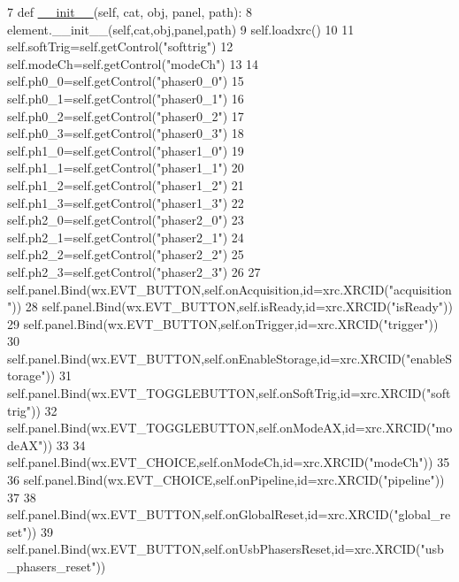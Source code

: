\begin{DoxyCode}
7     \textcolor{keyword}{def }\hyperlink{classwrapper_1_1ModuleDictWrapper_a9a7a794150502f51df687831583e13b9}{\_\_init\_\_}(self, cat, obj, panel, path):
8         element.\_\_init\_\_(self,cat,obj,panel,path)
9         self.loadxrc()
10                 
11         self.softTrig=self.getControl(\textcolor{stringliteral}{"softtrig"})
12         self.modeCh=self.getControl(\textcolor{stringliteral}{"modeCh"})
13 
14         self.ph0\_0=self.getControl(\textcolor{stringliteral}{"phaser0\_0"})
15         self.ph0\_1=self.getControl(\textcolor{stringliteral}{"phaser0\_1"})
16         self.ph0\_2=self.getControl(\textcolor{stringliteral}{"phaser0\_2"})
17         self.ph0\_3=self.getControl(\textcolor{stringliteral}{"phaser0\_3"})
18         self.ph1\_0=self.getControl(\textcolor{stringliteral}{"phaser1\_0"})
19         self.ph1\_1=self.getControl(\textcolor{stringliteral}{"phaser1\_1"})
20         self.ph1\_2=self.getControl(\textcolor{stringliteral}{"phaser1\_2"})
21         self.ph1\_3=self.getControl(\textcolor{stringliteral}{"phaser1\_3"})
22         self.ph2\_0=self.getControl(\textcolor{stringliteral}{"phaser2\_0"})
23         self.ph2\_1=self.getControl(\textcolor{stringliteral}{"phaser2\_1"})
24         self.ph2\_2=self.getControl(\textcolor{stringliteral}{"phaser2\_2"})
25         self.ph2\_3=self.getControl(\textcolor{stringliteral}{"phaser2\_3"})
26         
27         self.panel.Bind(wx.EVT\_BUTTON,self.onAcquisition,id=xrc.XRCID(\textcolor{stringliteral}{"acquisition"}))
28         self.panel.Bind(wx.EVT\_BUTTON,self.isReady,id=xrc.XRCID(\textcolor{stringliteral}{"isReady"}))
29         self.panel.Bind(wx.EVT\_BUTTON,self.onTrigger,id=xrc.XRCID(\textcolor{stringliteral}{"trigger"}))
30         self.panel.Bind(wx.EVT\_BUTTON,self.onEnableStorage,id=xrc.XRCID(\textcolor{stringliteral}{"enableStorage"}))
31         self.panel.Bind(wx.EVT\_TOGGLEBUTTON,self.onSoftTrig,id=xrc.XRCID(\textcolor{stringliteral}{"softtrig"}))
32         self.panel.Bind(wx.EVT\_TOGGLEBUTTON,self.onModeAX,id=xrc.XRCID(\textcolor{stringliteral}{"modeAX"}))
33 
34         self.panel.Bind(wx.EVT\_CHOICE,self.onModeCh,id=xrc.XRCID(\textcolor{stringliteral}{"modeCh"}))
35 
36         self.panel.Bind(wx.EVT\_CHOICE,self.onPipeline,id=xrc.XRCID(\textcolor{stringliteral}{"pipeline"}))
37 
38         self.panel.Bind(wx.EVT\_BUTTON,self.onGlobalReset,id=xrc.XRCID(\textcolor{stringliteral}{"global\_reset"}))
39         self.panel.Bind(wx.EVT\_BUTTON,self.onUsbPhasersReset,id=xrc.XRCID(\textcolor{stringliteral}{"usb\_phasers\_reset"}))

\end{DoxyCode}
